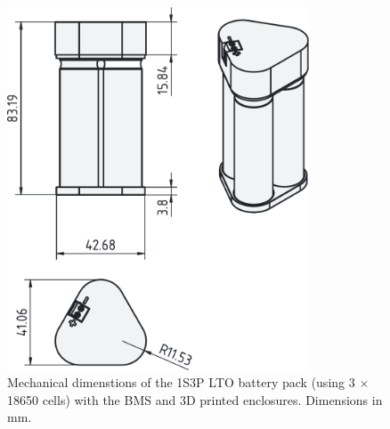 \documentclass[11pt]{datasheet}
\begin{document}
\begin{figure}[!ht]
    \centerline{%
        \includegraphics[width=0.8\textwidth]{../docs/LTO-BMS-revB-dimensions.pdf}
    }
    \caption{Mechanical dimenstions of the 1S3P LTO battery pack (using 3 $\times$ 18650 cells) with the BMS and 3D printed enclosures. Dimensions in mm.}
\end{figure}
\end{document}
